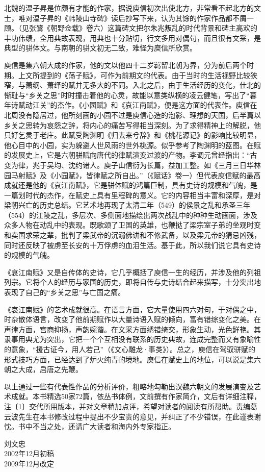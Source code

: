 北魏的温子昇是位颇有才能的作家，据说庾信初次出使北方，非常看不起北方的文士，唯对温子昇的《韩陵山寺碑》读后抄写下来，认为其馀的作家作品都不屑一顾。（见张鷟《朝野佥载》卷六）这篇碑文把尔朱兆叛乱的时代背景和碑主高欢的丰功伟绩，全用典故表现，用典也十分贴切，行文多用对偶句，而且很有文采，是典型的骈体文。与南朝的骈文初无二致，难怪为庾信所欣赏。

庾信是集六朝大成的作家，他的文以他四十二岁羁留北朝为界，分为前后两个时期。上文所提到的《荡子赋》，可作为前期文的代表。由于当时的生活视野比较狭窄，与萧纲、萧绎的赋并无多大的不同。入北之后，由于生活经历的变化，仕北的惭耻与“乡关之思”时时撞击着他的心灵，故能以意类纵横的凌云健笔，写出了“暮年诗赋动江关”的杰作。《小园赋》和《哀江南赋》，便是这方面的代表作。庾信在北周没有隐居过，他所刻画的小园不过是庾信心造的泡影、理想的天国，后半篇以乡关之思转为哀怨之辞，将内心的痛苦写得相当深刻。为了求得精神上的解脱，他只好乞灵于老庄。此赋受陶渊明《归去来兮辞》和《桃花源记》的影响比较明显，他心目中的小园，实为躲避人世风雨的世外桃源。似乎参考了陶渊明的蓝图。在赋的发展史上，它是六朝骈赋向唐代的律赋演变过渡的产物。李调元曾经指出：“古变为律，兆于吴均、沈约诸人。庾子山信衍为长篇，益加工整。如《三月三日华林园马射赋》及《小园赋》，皆律赋之所自出。”（《赋话》卷一）但代表庾信赋的最高成就还是他的《哀江南赋》，它是骈体赋的鸿篇巨制，具有史诗的规模和气魄，是一篇划时代的杰作，在赋史上具有里程碑的意义。它的内容相当丰富和深厚，是对梁朝兴亡的历史总结。它艺术地再现了太清二年（549）的侯景之乱和承圣三年（554）的江陵之乱，多层次、多侧面地描绘出两次战乱中的种种生动画面，涉及众多人物在动乱中的表现。既歌颂了卫国的英雄，也鞭挞了梁宗室子弟的坐观时变和卖国求荣之辈，批判了梁武帝的沉溺佛讲和不修武备，以及梁元帝的猜忌凶残，同时还反映了被虏至长安的十万俘虏的血泪生活。基于此，所以我们说它具有史诗的规模的气魄。

《哀江南赋》又是自传体的史诗，它几乎概括了庾信一生的经历，并涉及他的列祖列宗。它将个人的经历与家国的历史，即将自传与史诗结合起来描写，十分突出地表现了自己的“乡关之思”与亡国之痛。

《哀江南赋》的艺术成就很高。在语言方面，它大量使用四六对句，于对偶之中，时杂散体语言，改变了他前期赋作以大量诗语入赋的倾向，富有错综变化之美。在声律方面，宫商抑扬，声韵婉谐。在文采方面绣错绮交，形象生动，光色鲜艳。其隶事用典尤为突出，它把一个个互相没有联系的历史典故，连成完整而又有象喻性的意象，“援古证今，用人若己”（《文心雕龙·事类》）。总之，庾信在驾驭骈赋的形式技巧方面，已经达到了炉火纯青的境地。庾信在赋史上的地位，可以说是集六朝之大成，启唐之先鞭。

以上通过一些有代表性作品的分析评价，粗略地勾勒出汉魏六朝文的发展演变及艺术成就。本书精选50家72篇，依丛书体例，文前撰有作家简介，文后有详细注释，注〔1〕交代所用版本，并对文章稍加点评，希望对读者的阅读有所帮助。责编葛云波先生在本书修改过程中提出不少宝贵的意见，并纠正了不少错误，在此谨表谢忱。书中不当之处，还请广大读者和海内外专家指正。

\begin{flushright}
刘文忠\\
2002年12月初稿\\
2009年12月改定
\end{flushright}